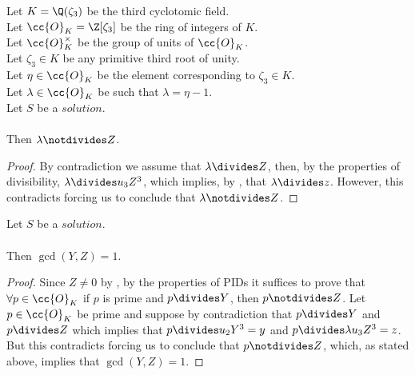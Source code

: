 \begin{lemma}
  \label{lmm:lambda_not_dvd_Z}
  \leanok
  Let $K = \Q(\zeta_3)$ be the third cyclotomic field. \\
  Let $\cc{O}_K = \Z[\zeta_3]$ be the ring of integers of $K$. \\
  Let $\cc{O}^\times_K$ be the group of units of $\cc{O}_K$. \\
  Let $\zeta_3 \in K$ be any primitive third root of unity. \\
  Let $\eta \in \cc{O}_K$ be the element corresponding to $\zeta_3 \in K$. \\
  Let $\lambda \in \cc{O}_K$ be such that $\lambda = \eta -1$. \\
  Let $S$ be a $solution$.\\\\
  Then $\lambda \notdivides Z$.
\end{lemma}
\begin{proof}
  \leanok
  By contradiction we assume that $\lambda \divides Z$, then, by the properties of divisibility,
  $\lambda \divides u_3 Z^3$, which implies, by ,
  that $\lambda \divides z$.
  However, this contradicts 
  forcing us to conclude that $\lambda \notdivides Z$.
\end{proof}

\begin{lemma}
  \label{lmm:coprime_Y_Z}
  \leanok
  Let $S$ be a $solution$.\\\\
  Then $\gcd(Y, Z) = 1$.
\end{lemma}
\begin{proof}
  \leanok
  Since $Z \neq 0$ by , by the properties of PIDs it suffices to prove that
  $\forall p \in \cc{O}_K$ if $p$ is prime and $p \divides Y$, then $p \notdivides Z$.
  Let $p \in \cc{O}_K$ be prime and suppose by contradiction that $p \divides Y$ and $p \divides Z$
  which implies that $p \divides u_2 Y^3 = y$ and $p \divides \lambda u_3 Z^3 = z$.
  But this contradicts  forcing us to conclude that $p \notdivides Z$, which,
  as stated above, implies that $\gcd(Y,Z)=1$.
\end{proof}

